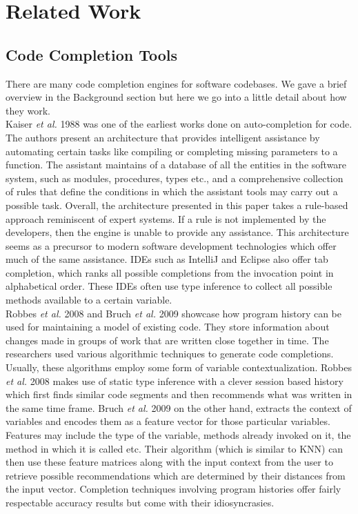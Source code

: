\section{Related Work}

\subsection{Code Completion Tools}
There are many code completion engines for software codebases. We gave a brief overview in the Background section but here we go into a little detail about how they work.\\

Kaiser \textit{et al.} 1988 was one of the earliest works done on auto-completion for code. The authors present an architecture that provides intelligent assistance by automating certain tasks like compiling or completing missing parameters to a function. The assistant maintains of a database of all the entities in the software system, such as modules, procedures, types etc., and a comprehensive collection of rules that define the conditions in which the assistant tools may carry out a possible task. Overall, the architecture presented in this paper takes a rule-based approach reminiscent of expert systems. If a rule is not implemented by the developers, then the engine is unable to provide any assistance. This architecture seems as a precursor to modern software development technologies which offer much of the same assistance. IDEs such as IntelliJ and Eclipse also offer tab completion, which ranks all possible completions from the invocation point in alphabetical order. These IDEs often use type inference to collect all possible methods available to a certain variable. \\

Robbes \textit{et al.} 2008 and Bruch \textit{et al.} 2009 showcase how program history can be used for maintaining a model of existing code. They store information about changes made in groups of work that are written close together in time. The researchers used various algorithmic techniques to generate code completions. Usually, these algorithms employ some form of variable contextualization. Robbes \textit{et al.} 2008 makes use of static type inference with a clever session based history which first finds similar code segments and then recommends what was written in the same time frame. Bruch \textit{et al.} 2009 on the other hand, extracts the context of variables and encodes them as a feature vector for those particular variables. Features may include the type of the variable, methods already invoked on it, the method in which it is called etc. Their algorithm (which is similar to KNN) can then use these feature matrices along with the input context from the user to retrieve possible recommendations which are determined by their distances from the input vector.  Completion techniques involving program histories offer fairly respectable accuracy results but come with their idiosyncrasies.\\  

